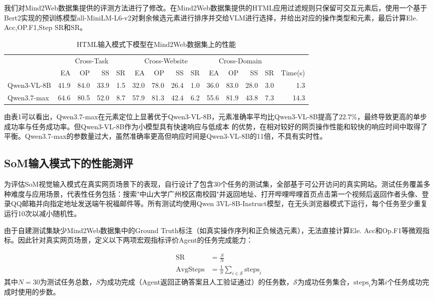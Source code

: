 \documentclass{SYSUReport}
\begin{document}
我们对Mind2Web数据集提供的评测方法进行了修改。在Mind2Web数据集提供的HTML应用过滤规则只保留可交互元素后，使用一个基于Bert2实现的预训练模型all-MiniLM-L6-v2对剩余候选元素进行排序并交给VLM进行选择，并给出对应的操作类型和元素，最后计算Ele. Acc,OP.F1,Step SR和SR。
\begin{table}[H]
\centering
\small
\caption{HTML输入模式下模型在Mind2Web数据集上的性能}
\label{tab:html_perf}
\setlength{\tabcolsep}{3pt}
\begin{tabular}{l|rrrr|rrrr|rrrr|r}
\toprule
& \multicolumn{4}{c}{Cross-Task} & \multicolumn{4}{c}{Cross-Website} & \multicolumn{4}{c}{Cross-Domain} & \\
\cmidrule(lr){2-5} \cmidrule(lr){6-9} \cmidrule(lr){10-13}
& EA & OP & SS & SR & EA & OP & SS & SR & EA & OP & SS & SR & Time(s) \\
\midrule
Qwen3-VL-8B & 41.9 & 84.0 & 33.9 & 1.5 & 32.0 & 78.0 & 26.4 & 1.0 & 36.0 & 83.0 & 28.0 & 3.0 & 1.3 \\
Qwen3.7-max & 64.6 & 80.5 & 52.0 & 8.7 & 57.9 & 81.3 & 42.4 & 6.2 & 55.6 & 81.9 & 43.8 & 7.3 & 14.3 \\
\bottomrule
\end{tabular}
\end{table}
由表1可以看出，Qwen3.7-max在元素定位上显著优于Qwen3-VL-8B，元素准确率平均比Qwen3-VL-8B提高了$22.7\%$，最终导致更高的单步成功率与任务成功率。但Qwen3-VL-8B作为小模型具有快速响应与低成本
的优势，在相对较好的网页操作性能和较快的响应时间中取得了平衡。Qwen3.7-max的参数量过大，虽然准确率更高但响应时间是Qwen3-VL-8B的11倍，不具有实时性。
\subsection{SoM输入模式下的性能测评}

为评估SoM视觉输入模式在真实网页场景下的表现，自行设计了包含30个任务的测试集，全部基于可公开访问的真实网站。测试任务覆盖多种难度与应用场景，代表性任务包括：搜索"中山大学广州校区南校园"并返回地址、打开哔哩哔哩首页点击第一个视频后返回作者头像、登录QQ邮箱并向指定地址发送端午祝福邮件等。所有测试均使用Qwen 3VL-8B-Instruct模型，在无头浏览器模式下运行，每个任务至少重复运行10次以减小随机性。

由于自建测试集缺少Mind2Web数据集中的Ground Truth标注（如真实操作序列和正负候选元素），无法直接计算Ele. Acc和Op.F1等微观指标。因此针对真实网页场景，定义以下两项宏观指标评价Agent的任务完成能力：

\begin{align*}
    \text{SR} &= \frac{S}{N} \\
    \text{AvgSteps} &= \frac{1}{S} \sum_{i \in \mathcal{S}} \text{steps}_i
\end{align*}
其中$N=30$为测试任务总数，$S$为成功完成（Agent返回正确答案且人工验证通过）的任务数，$\mathcal{S}$为成功任务集合，$\text{steps}_i$为第$i$个任务成功完成时使用的步数。
\end{document}
